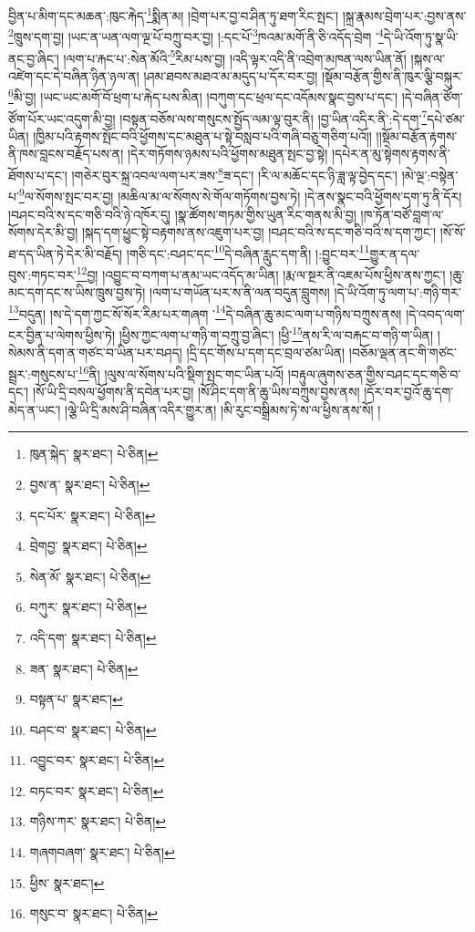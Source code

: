 བྱིན་པ་མིག་དང་མཆན་:ཁུང་རྐེད་\footnote{ཁུན་སྐེད་  སྣར་ཐང་།  པེ་ཅིན། }སྨིན་མ། །བྲེག་པར་བྱ་བ་ཤིན་ཏུ་ཐག་རིང་སྤང་། །སྐྲ་རྣམས་བྲེག་པར་:བྱས་ནས་\footnote{བྱས་ན་  སྣར་ཐང་།  པེ་ཅིན། }ཁྲུས་དག་བྱ། །ཡང་ན་ཡན་ལག་ལྔ་པོ་བཀྲུ་བར་བྱ། །:དང་པོ་\footnote{དང་པོར་  སྣར་ཐང་།  པེ་ཅིན། }ཁའམ་མགོ་ནི་ཅི་འདོད་བྲེག ་\footnote{བྲེགབྱ་  སྣར་ཐང་།  པེ་ཅིན། }དེ་ཡི་འོག་ཏུ་སྣ་ཡི་ནང་བྱ་ཞིང་། །ལག་པ་རྐང་པ་:སེན་མོའི་\footnote{སེན་མོ་  སྣར་ཐང་།  པེ་ཅིན། }རིམ་པས་བྱ། །འདི་ལྟར་འདི་ནི་འབྲེག་མཁན་ལས་ཡིན་ནོ། །སྐས་ལ་འཛེག་དང་དེ་བཞིན་ཉིན་ཉལ་ན། །ཤམ་ཐབས་མཐའ་མ་མདུད་པ་དོར་བར་བྱ། །སྡོམ་བརྩོན་གྱིས་ནི་ཁུར་ལྕི་བསྐུར་\footnote{བཀུར་  སྣར་ཐང་།  པེ་ཅིན། }མི་བྱ། །ཡང་ཡང་མགོ་བོ་ཕྲག་པ་རྐེད་པས་མིན། །བཀུག་དང་ཕྲལ་དང་འདོམས་སྣང་བྱས་པ་དང་། །དེ་བཞིན་ཙོག་ཙོག་པོར་ཡང་འདུག་མི་བྱ། །བསྟན་བཅོས་ལས་གསུངས་སྤྱོད་ལམ་ལྟ་བུར་ནི། །བྱ་ཡིན་འདིར་ནི་:དེ་དག་\footnote{འདི་དག་  སྣར་ཐང་།  པེ་ཅིན། }དཔེ་ཙམ་ཡིན། །ཁྱིམ་པའི་རྟགས་སྤོང་བའི་ཕྱོགས་དང་མཐུན་པ་སྟེ་བསླབ་པའི་གཞི་བཅུ་གཅིག་པའོ།། །།སྡོམ་བརྩོན་རྟགས་ནི་ཁས་བླངས་བརྗོད་པས་ན། །དེར་གཏོགས་ཉམས་པའི་ཕྱོགས་མཐུན་སྤང་བྱ་སྟེ། །དཔེར་ན་མུ་སྟེགས་རྟགས་ནི་ཐོགས་པ་དང་། །གཅེར་བུར་སྐྲ་འབལ་ལག་པར་ཟས་\footnote{ཟན་  སྣར་ཐང་།  པེ་ཅིན། }ཟ་དང་། །རི་ལ་མཆོང་དང་ཉི་ཟླ་ལྟ་བྱེད་དང་། །མེ་ལྔ་:བསྟེན་པ་\footnote{བསྟན་པ་  སྣར་ཐང་། }ལ་སོགས་སྤང་བར་བྱ། །མཆིལ་མ་ལ་སོགས་སེ་གོལ་གཏོགས་བྱས་ཏེ། །དེ་ནས་སྣང་བའི་ཕྱོགས་དག་ཏུ་ནི་དོར། །བཤང་བའི་ས་དང་གཅི་བའི་ཉེ་འཁོར་དུ། །སྣ་ཚོགས་གཏམ་གྱིས་ཡུན་རིང་གནས་མི་བྱ། །ཁ་ཏོན་བཙོ་བླག་ལ་སོགས་དེར་མི་བྱ། །སྐད་དག་ཕྱུང་སྟེ་བརྟགས་ནས་འཇུག་པར་བྱ། །བཤང་བའི་ས་དང་གཅི་བའི་ས་དག་ཀྱང་། །སོ་སོ་ཐ་དད་ཡིན་ཏེ་དེར་མི་བརྗོད། །གཅི་དང་:བཤང་དང་\footnote{བཤང་བ་  སྣར་ཐང་།  པེ་ཅིན། }དེ་བཞིན་རླུང་དག་ནི། །:བྱུང་བར་\footnote{འབྱུང་བར་  སྣར་ཐང་།  པེ་ཅིན། }གྱུར་ན་དལ་བུས་:གཏང་བར་\footnote{བཏང་བར་  སྣར་ཐང་།  པེ་ཅིན། }བྱ། །འབྱུང་བ་བཀག་པ་ནམ་ཡང་འདོད་མ་ཡིན། །རྨ་ལ་སྔར་ནི་འཇམ་པོས་ཕྱིས་ནས་ཀྱང་། །ཆུ་མང་དག་དང་ས་ཡིས་ཁྲུས་བྱས་ཏེ། །ལག་པ་གཡོན་པར་ས་ནི་ལན་བདུན་བླུགས། །དེ་ཡི་འོག་ཏུ་ལག་པ་:གཉི་གར་\footnote{གཉིས་ཀར་  སྣར་ཐང་།  པེ་ཅིན། }བདུན། །ས་དེ་དག་ཀྱང་སོ་སོར་རིམ་པར་གཞག ་\footnote{གཞགབཞག་  སྣར་ཐང་།  པེ་ཅིན། }དེ་བཞིན་ཆུ་མང་ལག་པ་གཉིས་བཀྲུས་ནས། །དེ་འབད་ལག་ངར་བྱིན་པ་ལེགས་ཕྱིས་ཏེ། །ཕྱིས་ཀྱང་ལག་པ་གཉི་ག་བཀྲུ་བྱ་ཞིང་། །ཕྱི་\footnote{ཕྱིས་  སྣར་ཐང་། }ནས་རི་ལ་བརྐང་བ་གཉི་ག་ཡིན། །སེམས་ནི་དག་ན་གཙང་བ་ཡིན་པར་བཤད། །དྲི་དང་གོས་པ་དག་དང་བྲལ་ཙམ་ཡིན། །བཅོམ་ལྡན་ནང་གི་གཙང་སྦྲར་:གསུངས་པ་\footnote{གསུང་བ་  སྣར་ཐང་།  པེ་ཅིན། }ནི། །ལུས་ལ་སོགས་པའི་སྡིག་སྤང་གང་ཡིན་པའོ། །བརྟུལ་ཞུགས་ཅན་གྱིས་བཤང་དང་གཅི་བ་དང་། །སོ་ཡི་དྲི་བསལ་ཕྱོགས་ནི་དབེན་པར་བྱ། །སོ་ཤིང་དག་ནི་ཆུ་ཡིས་བཀྲུས་བྱས་ནས། །དོར་བར་བྱའོ་ཆུ་དག་མེད་ན་ཡང་། །ལྕེ་ཡི་དྲི་མས་ཤི་བཞིན་འདིར་གྱུར་ན། །མི་རུང་བསྒྲིམས་ཏེ་ས་ལ་ཕྱིས་ནས་སོ། །
